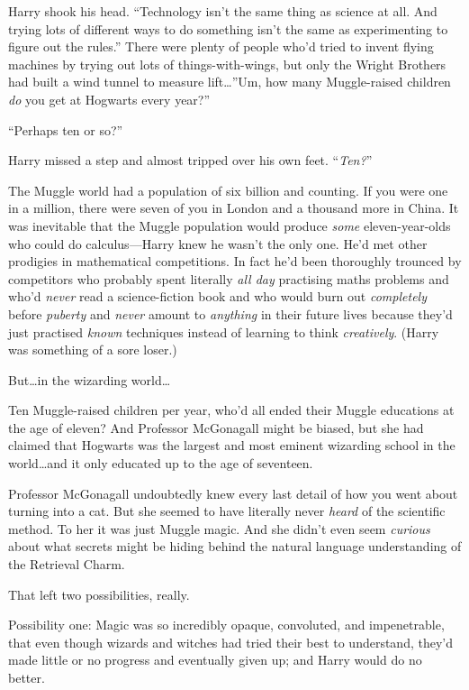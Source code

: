 Harry shook his head. “Technology isn’t the same thing as science at all. And trying lots of different ways to do something isn’t the same as experimenting to figure out the rules.” There were plenty of people who’d tried to invent flying machines by trying out lots of things-with-wings, but only the Wright Brothers had built a wind tunnel to measure lift…”Um, how many Muggle-raised children \emph{do} you get at Hogwarts every year?”

“Perhaps ten or so?”

Harry missed a step and almost tripped over his own feet. “\emph{Ten?}”

The Muggle world had a population of six billion and counting. If you were one in a million, there were seven of you in London and a thousand more in China. It was inevitable that the Muggle population would produce \emph{some} eleven-year-olds who could do calculus—Harry knew he wasn’t the only one. He’d met other prodigies in mathematical competitions. In fact he’d been thoroughly trounced by competitors who probably spent literally \emph{all day} practising maths problems and who’d \emph{never} read a science-fiction book and who would burn out \emph{completely} before \emph{puberty} and \emph{never} amount to \emph{anything} in their future lives because they’d just practised \emph{known} techniques instead of learning to think \emph{creatively}. (Harry was something of a sore loser.)

But…in the wizarding world…

Ten Muggle-raised children per year, who’d all ended their Muggle educations at the age of eleven? And Professor McGonagall might be biased, but she had claimed that Hogwarts was the largest and most eminent wizarding school in the world…and it only educated up to the age of seventeen.

Professor McGonagall undoubtedly knew every last detail of how you went about turning into a cat. But she seemed to have literally never \emph{heard} of the scientific method. To her it was just Muggle magic. And she didn’t even seem \emph{curious} about what secrets might be hiding behind the natural language understanding of the Retrieval Charm.

That left two possibilities, really.

Possibility one: Magic was so incredibly opaque, convoluted, and impenetrable, that even though wizards and witches had tried their best to understand, they’d made little or no progress and eventually given up; and Harry would do no better.

